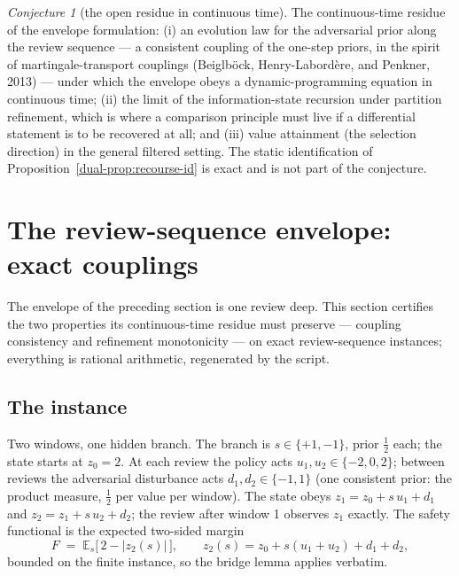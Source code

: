 \documentclass[10pt,twocolumn]{article}
\theoremstyle{plain}
\theoremstyle{definition}
\theoremstyle{remark}
\newtheorem{conjecture}{Conjecture}
\begin{document}
\begin{conjecture}[the open residue in continuous time]\label{dual-conj:envelope}
The continuous-time residue of the envelope formulation: (i) an evolution
law for the adversarial prior along the review sequence --- a consistent
coupling of the one-step priors, in the spirit of martingale-transport
couplings (Beiglb\"ock, Henry-Labord\`ere, and Penkner, 2013) --- under which the envelope obeys a dynamic-programming equation
in continuous time; (ii) the limit of the information-state recursion under
partition refinement, which is where a comparison principle must live if a
differential statement is to be recovered at all; and (iii) value
attainment (the selection direction) in the general filtered setting. The
static identification of Proposition~\ref{dual-prop:recourse-id} is exact and is
not part of the conjecture.
\end{conjecture}

\section{The review-sequence envelope: exact couplings}

The envelope of the preceding section is one review deep. This section certifies
the two properties its continuous-time residue must preserve --- coupling
consistency and refinement monotonicity --- on exact review-sequence
instances; everything is rational arithmetic, regenerated by the script.

\subsection{The instance}

Two windows, one hidden branch. The branch is $s \in \{+1, -1\}$, prior
$\tfrac{1}{2}$ each; the state starts at $z_0 = 2$. At each review the
policy acts $u_1, u_2 \in \{-2, 0, 2\}$; between reviews the adversarial
disturbance acts $d_1, d_2 \in \{-1, 1\}$ (one consistent prior: the
product measure, $\tfrac{1}{2}$ per value per window). The state obeys
$z_1 = z_0 + s\, u_1 + d_1$ and $z_2 = z_1 + s\, u_2 + d_2$; the review
after window 1 observes $z_1$ exactly. The safety functional is the
expected two-sided margin
\[
F \;=\; \mathbb{E}_{s}\bigl[\, 2 - |z_{2}(s)| \,\bigr],
\qquad z_{2}(s) = z_0 + s(u_1 + u_2) + d_1 + d_2,
\]
bounded on the finite instance, so the bridge lemma applies verbatim.
\end{document}
